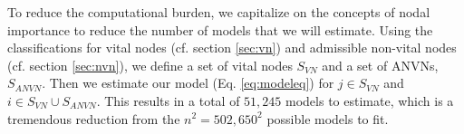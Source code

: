 
To reduce the computational burden, we capitalize on the concepts of nodal importance to reduce the number of models that we will estimate. Using the classifications for vital nodes (cf. section \ref{sec:vn}) and admissible non-vital nodes (cf. section \ref{sec:nvn}), we define a set of vital nodes $S_{VN}$  and a set of ANVNs, $S_{ANVN}$. Then we estimate our model (Eq. \eqref{eq:modeleq}) for $j \in S_{VN}$ and $i \in S_{VN} \cup S_{ANVN}$. This results in a total of $51,245$ models to estimate, which is a tremendous reduction from the $n^2=502,650^2$ possible models to fit. %

